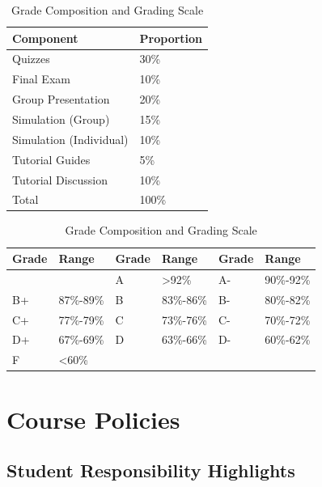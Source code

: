 \documentclass[10pt,]{article}
\begin{document}
\begin{table}[!h]
\caption{\label{tab:unnamed-chunk-2}Grade Composition and Grading Scale}

\centering
\begin{tabular}[t]{ll}
\toprule
Component & Proportion\\
\midrule
Quizzes & 30\%\\
Final Exam & 10\%\\
Group Presentation & 20\%\\
Simulation (Group) & 15\%\\
Simulation (Individual) & 10\%\\
\addlinespace
Tutorial Guides & 5\%\\
Tutorial Discussion & 10\%\\
Total & 100\%\\
\bottomrule
\end{tabular}
\centering
\begin{tabular}[t]{llllll}
\toprule
Grade & Range & Grade & Range & Grade & Range\\
\midrule
 &  & A & >92\% & A- & 90\%-92\%\\
B+ & 87\%-89\% & B & 83\%-86\% & B- & 80\%-82\%\\
C+ & 77\%-79\% & C & 73\%-76\% & C- & 70\%-72\%\\
D+ & 67\%-69\% & D & 63\%-66\% & D- & 60\%-62\%\\
F & <60\% &  &  &  & \\
\bottomrule
\end{tabular}
\end{table}

\newpage

\hypertarget{course-policies}{%
\section{Course Policies}\label{course-policies}}

\hypertarget{student-responsibility-highlights}{%
\subsection{Student Responsibility
Highlights}\label{student-responsibility-highlights}}
\end{document}
